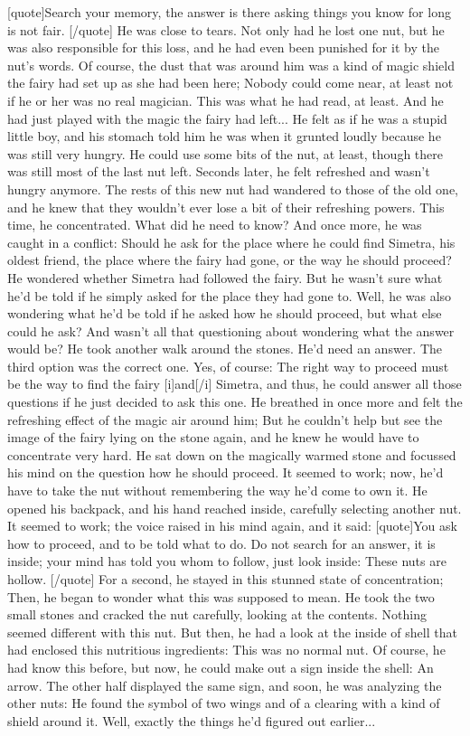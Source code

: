 [quote]Search your memory, the answer is there 
asking things you know for long is not fair. 
[/quote]
He was close to tears. Not only had he lost one nut, but he was also responsible for this loss, and he had even been punished for it by the nut's words. Of course, the dust that was around him was a kind of magic shield the fairy had set up as she had been here; Nobody could come near, at least not if he or her was no real magician. This was what he had read, at least. And he had just played with the magic the fairy had left... 
He felt as if he was a stupid little boy, and his stomach told him he was when it grunted loudly because he was still very hungry. He could use some bits of the nut, at least, though there was still most of the last nut left. 
Seconds later, he felt refreshed and wasn't hungry anymore. The rests of this new nut had wandered to those of the old one, and he knew that they wouldn't ever lose a bit of their refreshing powers. 
This time, he concentrated. What did he need to know? And once more, he was caught in a conflict: Should he ask for the place where he could find Simetra, his oldest friend, the place where the fairy had gone, or the way he should proceed? He wondered whether Simetra had followed the fairy. But he wasn't sure what he'd be told if he simply asked for the place they had gone to. Well, he was also wondering what he'd be told if he asked how he should proceed, but what else could he ask? And wasn't all that questioning about wondering what the answer would be? 
He took another walk around the stones. He'd need an answer. The third option was the correct one. Yes, of course: The right way to proceed must be the way to find the fairy [i]and[/i] Simetra, and thus, he could answer all those questions if he just decided to ask this one. 
He breathed in once more and felt the refreshing effect of the magic air around him; But he couldn't help but see the image of the fairy lying on the stone again, and he knew he would have to concentrate very hard. He sat down on the magically warmed stone and focussed his mind on the question how he should proceed. It seemed to work; now, he'd have to take the nut without remembering the way he'd come to own it. He opened his backpack, and his hand reached inside, carefully selecting another nut. 
It seemed to work; the voice raised in his mind again, and it said: 
[quote]You ask how to proceed, 
and to be told what to do. 
Do not search for an answer, 
it is inside; 
your mind has told you whom to follow, 
just look inside: These nuts are hollow. 
[/quote]
For a second, he stayed in this stunned state of concentration; Then, he began to wonder what this was supposed to mean. He took the two small stones and cracked the nut carefully, looking at the contents. Nothing seemed different with this nut. But then, he had a look at the inside of shell that had enclosed this nutritious ingredients: This was no normal nut. Of course, he had know this before, but now, he could make out a sign inside the shell: An arrow. The other half displayed the same sign, and soon, he was analyzing the other nuts: He found the symbol of two wings and of a clearing with a kind of shield around it. Well, exactly the things he'd figured out earlier... 
